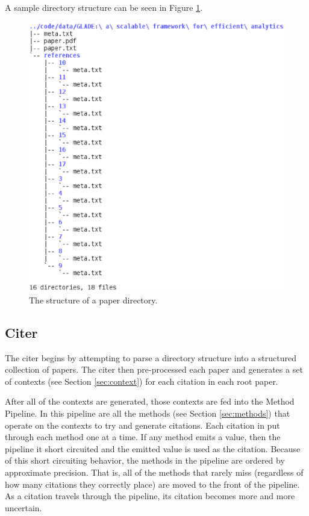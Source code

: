 \documentclass[10pt, conference, compsocconf]{IEEEtran}
\begin{document}

A sample directory structure can be seen in Figure \ref{fig:tree}.

\begin{figure}[ht]
   \includegraphics[width=\columnwidth]{images/tree.eps}
        \caption{The structure of a paper directory.}
        \label{fig:tree}
\end{figure}

\subsection{Citer}\label{sec:archCiter}
The citer begins by attempting to parse a directory structure into a structured collection of papers.
The citer then pre-processed each paper and generates a set of contexts (see Section \ref{sec:context}) for each citation in each
root paper.

After all of the contexts are generated, those contexts are fed into the Method Pipeline. In this pipeline are all the methods (see Section \ref{sec:methods})
that operate on the contexts to try and generate citations. Each citation in put through each method one at a time. If any method emits a value, then the pipeline
it short circuited and the emitted value is used as the citation. Because of this short circuiting behavior, the methods in the pipeline are ordered by approximate
precision. That is, all of the methods that rarely miss (regardless of how many citations they correctly place) are moved to the front of the pipeline.
As a citation travels through the pipeline, its citation becomes more and more uncertain.
\end{document}

